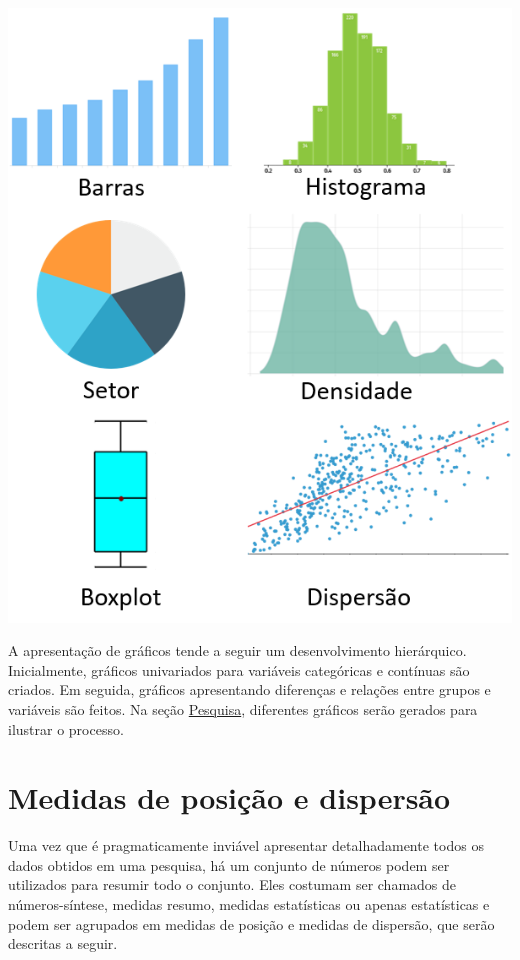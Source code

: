 \documentclass[
]{book}
\begin{document}
\includegraphics{./img/cap_graficos.png}

A apresentação de gráficos tende a seguir um desenvolvimento hierárquico. Inicialmente, gráficos univariados para variáveis categóricas e contínuas são criados. Em seguida, gráficos apresentando diferenças e relações entre grupos e variáveis são feitos. Na seção \protect\hyperlink{pesquisa}{Pesquisa}, diferentes gráficos serão gerados para ilustrar o processo.

\hypertarget{medidas-de-posiuxe7uxe3o-e-dispersuxe3o}{%
\section{Medidas de posição e dispersão}\label{medidas-de-posiuxe7uxe3o-e-dispersuxe3o}}

Uma vez que é pragmaticamente inviável apresentar detalhadamente todos os dados obtidos em uma pesquisa, há um conjunto de números podem ser utilizados para resumir todo o conjunto. Eles costumam ser chamados de números-síntese, medidas resumo, medidas estatísticas ou apenas estatísticas e podem ser agrupados em medidas de posição e medidas de dispersão, que serão descritas a seguir.
\end{document}
